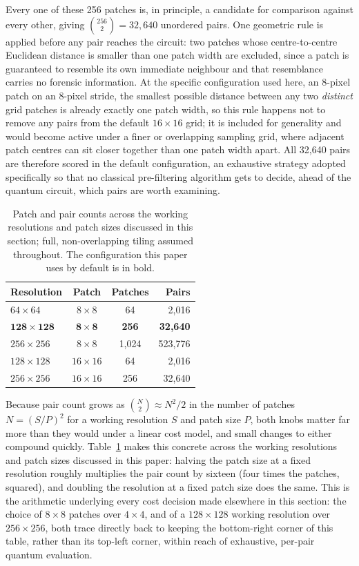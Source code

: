 \documentclass[conference]{IEEEtran}
\begin{document}
Every one of these 256 patches is, in principle, a candidate for comparison against every other, giving $\binom{256}{2} = 32{,}640$ unordered pairs. One geometric rule is applied before any pair reaches the circuit: two patches whose centre-to-centre Euclidean distance is smaller than one patch width are excluded, since a patch is guaranteed to resemble its own immediate neighbour and that resemblance carries no forensic information. At the specific configuration used here, an 8-pixel patch on an 8-pixel stride, the smallest possible distance between any two \emph{distinct} grid patches is already exactly one patch width, so this rule happens not to remove any pairs from the default $16\times16$ grid; it is included for generality and would become active under a finer or overlapping sampling grid, where adjacent patch centres can sit closer together than one patch width apart. All 32,640 pairs are therefore scored in the default configuration, an exhaustive strategy adopted specifically so that no classical pre-filtering algorithm gets to decide, ahead of the quantum circuit, which pairs are worth examining.

\begin{table}[t]
\centering
\caption{Patch and pair counts across the working resolutions and patch sizes discussed in this section; full, non-overlapping tiling assumed throughout. The configuration this paper uses by default is in bold.}
\label{tab:pairscaling}
\begin{tabular}{lccr}
\toprule
\textbf{Resolution} & \textbf{Patch} & \textbf{Patches} & \textbf{Pairs}\\
\midrule
$64\times64$ & $8\times8$ & 64 & 2,016\\
$\mathbf{128\times128}$ & $\mathbf{8\times8}$ & \textbf{256} & \textbf{32,640}\\
$256\times256$ & $8\times8$ & 1,024 & 523,776\\
$128\times128$ & $16\times16$ & 64 & 2,016\\
$256\times256$ & $16\times16$ & 256 & 32,640\\
\bottomrule
\end{tabular}
\end{table}

Because pair count grows as $\binom{N}{2} \approx N^2/2$ in the number of patches $N = (S/P)^2$ for a working resolution $S$ and patch size $P$, both knobs matter far more than they would under a linear cost model, and small changes to either compound quickly. Table~\ref{tab:pairscaling} makes this concrete across the working resolutions and patch sizes discussed in this paper: halving the patch size at a fixed resolution roughly multiplies the pair count by sixteen (four times the patches, squared), and doubling the resolution at a fixed patch size does the same. This is the arithmetic underlying every cost decision made elsewhere in this section: the choice of $8\times8$ patches over $4\times4$, and of a $128\times128$ working resolution over $256\times256$, both trace directly back to keeping the bottom-right corner of this table, rather than its top-left corner, within reach of exhaustive, per-pair quantum evaluation.
\end{document}
